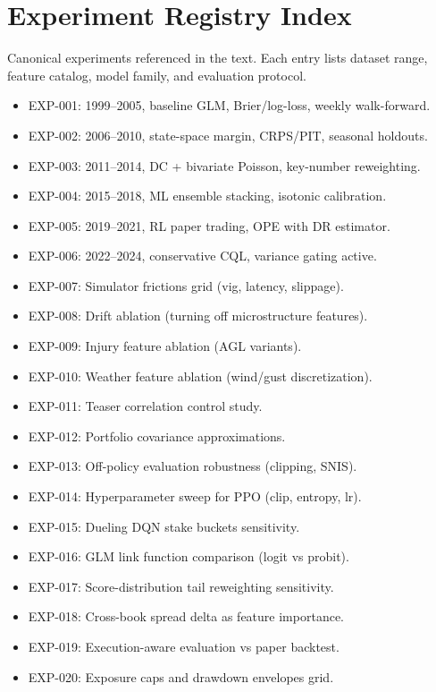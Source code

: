 \documentclass[12pt]{report}  %
\numberwithin{equation}{section}
\theoremstyle{plain}
\theoremstyle{definition}
\theoremstyle{remark}
\begin{document}
\chapter{Experiment Registry Index}
Canonical experiments referenced in the text. Each entry lists dataset range, feature catalog, model family, and evaluation protocol.
\begin{itemize}
  \item EXP-001: 1999--2005, baseline GLM, Brier/log-loss, weekly walk-forward.
  \item EXP-002: 2006--2010, state-space margin, CRPS/PIT, seasonal holdouts.
  \item EXP-003: 2011--2014, DC + bivariate Poisson, key-number reweighting.
  \item EXP-004: 2015--2018, ML ensemble stacking, isotonic calibration.
  \item EXP-005: 2019--2021, RL paper trading, OPE with DR estimator.
  \item EXP-006: 2022--2024, conservative CQL, variance gating active.
  \item EXP-007: Simulator frictions grid (vig, latency, slippage).
  \item EXP-008: Drift ablation (turning off microstructure features).
  \item EXP-009: Injury feature ablation (AGL variants).
  \item EXP-010: Weather feature ablation (wind/gust discretization).
  \item EXP-011: Teaser correlation control study.
  \item EXP-012: Portfolio covariance approximations.
  \item EXP-013: Off-policy evaluation robustness (clipping, SNIS).
  \item EXP-014: Hyperparameter sweep for PPO (clip, entropy, lr).
  \item EXP-015: Dueling DQN stake buckets sensitivity.
  \item EXP-016: GLM link function comparison (logit vs probit).
  \item EXP-017: Score-distribution tail reweighting sensitivity.
  \item EXP-018: Cross-book spread delta as feature importance.
  \item EXP-019: Execution-aware evaluation vs paper backtest.
  \item EXP-020: Exposure caps and drawdown envelopes grid.
\end{itemize}
\end{document}

